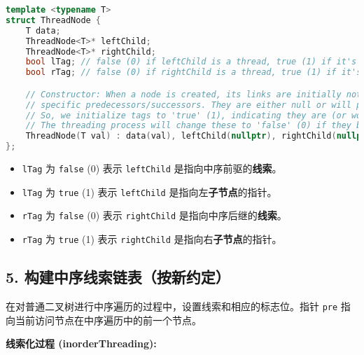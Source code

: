 \begin{lstlisting}[language=C++]
template <typename T>
struct ThreadNode {
    T data;
    ThreadNode<T>* leftChild;
    ThreadNode<T>* rightChild;
    bool lTag; // false (0) if leftChild is a thread, true (1) if it's a child
    bool rTag; // false (0) if rightChild is a thread, true (1) if it's a child

    // Constructor: When a node is created, its links are initially not threads pointing to
    // specific predecessors/successors. They are either null or will point to children.
    // So, we initialize tags to 'true' (1), indicating they are (or would be) child links.
    // The threading process will change these to 'false' (0) if they become threads.
    ThreadNode(T val) : data(val), leftChild(nullptr), rightChild(nullptr), lTag(true), rTag(true) {}
};
\end{lstlisting}
\begin{itemize}
	\item \lstinline{lTag} 为 \lstinline{false} (0) 表示 \lstinline{leftChild} 是指向中序前驱的\textbf{线索}。
	\item \lstinline{lTag} 为 \lstinline{true} (1) 表示 \lstinline{leftChild} 是指向左\textbf{子节点}的指针。
	\item \lstinline{rTag} 为 \lstinline{false} (0) 表示 \lstinline{rightChild} 是指向中序后继的\textbf{线索}。
	\item \lstinline{rTag} 为 \lstinline{true} (1) 表示 \lstinline{rightChild} 是指向右\textbf{子节点}的指针。
\end{itemize}

\subsection{5. 构建中序线索链表（按新约定）}

在对普通二叉树进行中序遍历的过程中，设置线索和相应的标志位。指针 \lstinline{pre} 指向当前访问节点在中序遍历中的前一个节点。

\textbf{线索化过程 (inorderThreading):}

